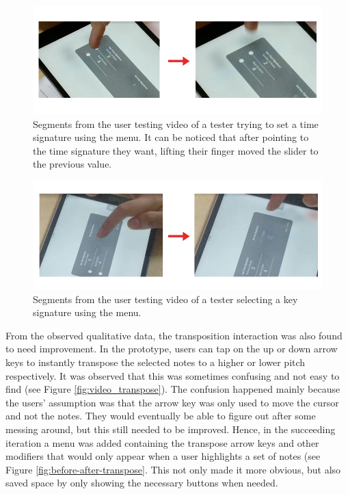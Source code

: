 				\begin{figure}[h]
					\centering
					\includegraphics[scale=0.5]{figures/video_timesig.png}
				    \caption{Segments from the user testing video of a tester trying to set a time signature using the menu. It can be noticed that after pointing to the time signature they want, lifting their finger moved the slider to the previous value.}
				    \label{fig:video_timesig}
				\end{figure}

				\begin{figure}[h]
					\centering
					\includegraphics[scale=0.5]{figures/video_keysig.png}
				    \caption{Segments from the user testing video of a tester selecting a key signature using the menu.}
				    \label{fig:video_keysig}
				\end{figure}

				From the observed qualitative data, the transposition interaction was also found to need improvement. In the prototype, users can tap on the up or down arrow keys to instantly transpose the selected notes to a higher or lower pitch respectively. It was observed that this was sometimes confusing and not easy to find (see Figure \ref{fig:video_transpose}). The confusion happened mainly because the users' assumption was that the arrow key was only used to move the cursor and not the notes. They would eventually be able to figure out after some messing around, but this still needed to be improved. Hence, in the succeeding iteration a menu was added containing the transpose arrow keys and other modifiers that would only appear when a user highlights a set of notes (see Figure \ref{fig:before-after-transpose}. This not only made it more obvious, but also saved space by only showing the necessary buttons when needed.

